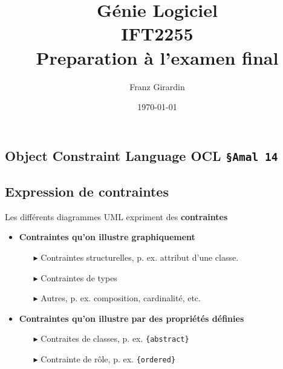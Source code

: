 \documentclass[16pt]{report}
\title{\Huge{Génie Logiciel}\\{IFT2255}\\{\textbf{Preparation à l'examen final}}}
\author{\huge{Franz Girardin}}
\date{\today}
\begin{document}
\maketitle
\pagebreak
\tableofcontents 
\pagebreak



\begin{multicols*}{2}
    \chapter{Object Constraint Language OCL \texttt{\S Amal 14}  }

        \section{Expression de contraintes}
        \begin{note}{}{}
            Les différents diagrammes UML expriment des \textbf{contraintes}  
        \end{note}

        \begin{itemize}
            \item \textbf{Contraintes qu'on illustre graphiquement}
                \begin{itemize}
                    \item[$\blacktriangleright$] Contraintes structurelles, p. ex. attribut d'une classe. 
                    \item[$\blacktriangleright$] Contraintes de types
                    \item[$\blacktriangleright$] Autres, p. ex. composition, cardinalité, etc. 
                    
                \end{itemize}
            \item \textbf{Contraintes qu'on illustre par des propriétés définies}
                    \begin{enumerate}
                        \item[$\blacktriangleright$] Contraites de classes, p. ex. \texttt{\{abstract\}}  
                        \item[$\blacktriangleright$] Contrainte de rôle, p. ex. \texttt{\{ordered\}}
                    \end{enumerate}

        \end{itemize}


\end{multicols*}
\end{document}
